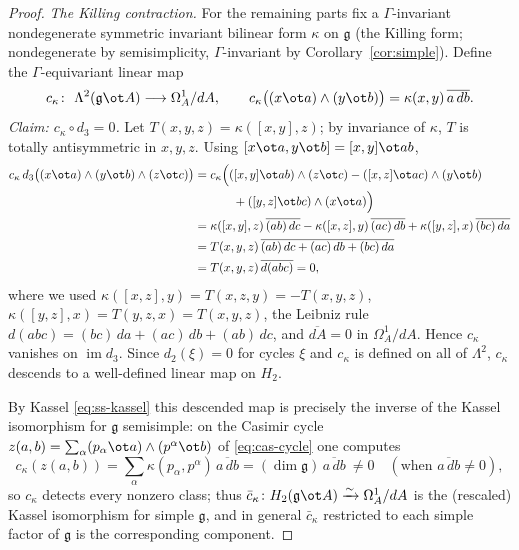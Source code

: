 \documentclass{amsart}
\theoremstyle{definition}
\DeclareMathOperator{\im}{im}
\newcommand{\g}{\mathfrak{g}}
\newcommand{\Om}{\Omega}
\newcommand{\Gm}{\Gamma}
\begin{document}
\begin{proof}
\smallskip
\emph{The Killing contraction.}  For the remaining parts fix a $\Gm$-invariant
nondegenerate symmetric invariant bilinear form $\kappa$ on $\g$ (the Killing
form; nondegenerate by semisimplicity, $\Gm$-invariant by
Corollary~\ref{cor:simple}).  Define the $\Gm$-equivariant linear map
\[
   c_\kappa\colon\ \Lambda^2(\g\ot A)\longrightarrow\Om^1_A/dA,\qquad
   c_\kappa\bigl((x\ot a)\wedge(y\ot b)\bigr)=\kappa(x,y)\,\overline{a\,db}.
\]
\emph{Claim: $c_\kappa\circ d_3=0$.}  Let $T(x,y,z)=\kappa([x,y],z)$; by
invariance of $\kappa$, $T$ is totally antisymmetric in $x,y,z$.  Using
$[x\ot a,y\ot b]=[x,y]\ot ab$,
\[
\begin{aligned}
c_\kappa\,d_3\bigl((x\ot a)\wedge(y\ot b)\wedge(z\ot c)\bigr)
 &=c_\kappa\Bigl(([x,y]\ot ab)\wedge(z\ot c)-([x,z]\ot ac)\wedge(y\ot b)\\
 &\hspace{3.2em}+([y,z]\ot bc)\wedge(x\ot a)\Bigr)\\
 &=\kappa([x,y],z)\,\overline{(ab)\,dc}-\kappa([x,z],y)\,\overline{(ac)\,db}
   +\kappa([y,z],x)\,\overline{(bc)\,da}\\
 &=T(x,y,z)\,\overline{(ab)\,dc+(ac)\,db+(bc)\,da}\\
 &=T(x,y,z)\,\overline{d(abc)}=0,
\end{aligned}
\]
where we used $\kappa([x,z],y)=T(x,z,y)=-T(x,y,z)$,
$\kappa([y,z],x)=T(y,z,x)=T(x,y,z)$, the Leibniz rule
$d(abc)=(bc)\,da+(ac)\,db+(ab)\,dc$, and $\overline{dA}=0$ in $\Om^1_A/dA$.  Hence
$c_\kappa$ vanishes on $\im d_3$.  Since $d_2(\xi)=0$ for cycles $\xi$ and
$c_\kappa$ is defined on all of $\Lambda^2$, $c_\kappa$ descends to a well-defined
linear map on $H_2$.

By Kassel \eqref{eq:ss-kassel} this descended map is precisely the inverse of
the Kassel isomorphism for $\g$ semisimple: on the Casimir cycle
$z(a,b)=\sum_\alpha(p_\alpha\ot a)\wedge(p^\alpha\ot b)$ of \eqref{eq:cas-cycle}
one computes
\[
   c_\kappa(z(a,b))=\sum_\alpha\kappa(p_\alpha,p^\alpha)\,\overline{a\,db}
   =(\dim\g)\,\overline{a\,db}\ \ne 0 \quad(\text{when }\overline{a\,db}\ne0),
\]
so $c_\kappa$ detects every nonzero class; thus
$\bar c_\kappa\colon H_2(\g\ot A)\xrightarrow{\sim}\Om^1_A/dA$ is the (rescaled)
Kassel isomorphism for simple $\g$, and in general $\bar c_\kappa$ restricted to
each simple factor of $\g$ is the corresponding component.


\end{proof}
\end{document}
